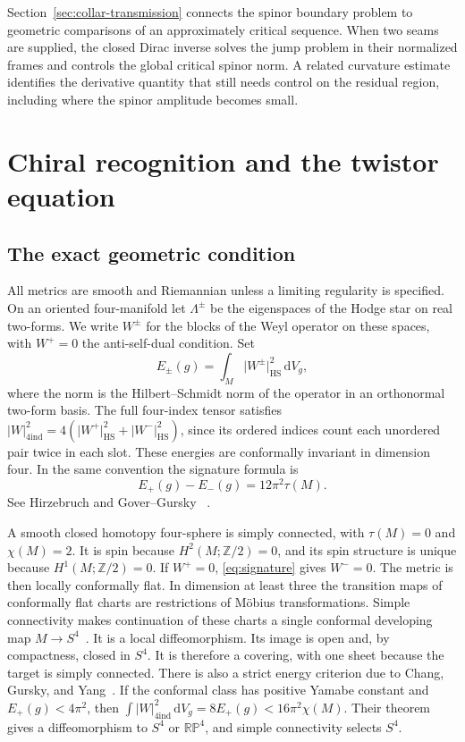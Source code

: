 \documentclass[11pt]{article}
\numberwithin{equation}{section}
\newcommand{\dd}{\mathrm{d}}
\newcommand{\Sphere}{S^4}
\newcommand{\abs}[1]{\lvert #1\rvert}
\newcommand{\dv}{\dd V_g}
\begin{document}
Section~\ref{sec:collar-transmission} connects the spinor boundary
problem to geometric comparisons of an approximately critical sequence.
When two seams are supplied, the closed Dirac inverse solves the
jump problem in their normalized frames and controls the global
critical spinor norm. A related curvature estimate identifies the
derivative quantity that still needs control on the residual
region, including where the spinor amplitude becomes small.

\section{Chiral recognition and the twistor equation}\label{sec:twistor}

\subsection{The exact geometric condition}

All metrics are smooth and Riemannian unless a limiting regularity is
specified. On an oriented four-manifold let \(\Lambda^\pm\) be the
eigenspaces of the Hodge star on real two-forms. We write \(W^\pm\) for
the blocks of the Weyl operator on these spaces, with \(W^+=0\) the
anti-self-dual condition. Set
\[
 E_\pm(g)=\int_M\abs{W^\pm}_{\mathrm{HS}}^2\,\dv ,
\]
where the norm is the Hilbert--Schmidt norm of the operator in an
orthonormal two-form basis. The full four-index tensor satisfies
\(\abs{W}_{4\mathrm{ind}}^2=4(\abs{W^+}_{\mathrm{HS}}^2+
\abs{W^-}_{\mathrm{HS}}^2)\), since its ordered indices count each
unordered pair twice in each slot. These energies are conformally
invariant in dimension four. In the same convention the signature
formula is
\begin{equation}\label{eq:signature}
 E_+(g)-E_-(g)=12\pi^2\tau(M).
\end{equation}
See Hirzebruch and Gover--Gursky~\cite[\S4]{Hirzebruch1971Signature}
\cite[pp.~293--294]{GoverGursky2024}.

A smooth closed homotopy four-sphere is simply connected, with
\(\tau(M)=0\) and \(\chi(M)=2\). It is spin because \(H^2(M;\mathbb Z/2)=0\),
and its spin structure is unique because \(H^1(M;\mathbb Z/2)=0\).
If \(W^+=0\), \eqref{eq:signature} gives \(W^-=0\). The metric is then
locally conformally flat. In dimension at least three the transition
maps of conformally flat charts are restrictions of M\"obius
transformations. Simple connectivity makes continuation of these charts
a single conformal developing map \(M\to\Sphere\)~\cite[\S1]{SchoenYau1988Conformal}.
It is a local diffeomorphism. Its image is open and, by compactness,
closed in \(\Sphere\). It is therefore a covering, with one sheet
because the target is simply connected. There is also a strict energy
criterion due to Chang, Gursky, and Yang~\cite[Theorem~A]{ChangGurskyYang2003}.
If the conformal class has positive Yamabe constant and
\(E_+(g)<4\pi^2\), then
\(\int\abs{W}_{4\mathrm{ind}}^2\,\dv=8E_+(g)<16\pi^2\chi(M)\).
Their theorem gives a diffeomorphism to \(\Sphere\) or
\(\mathbb{RP}^4\), and simple connectivity selects \(\Sphere\).
\end{document}
